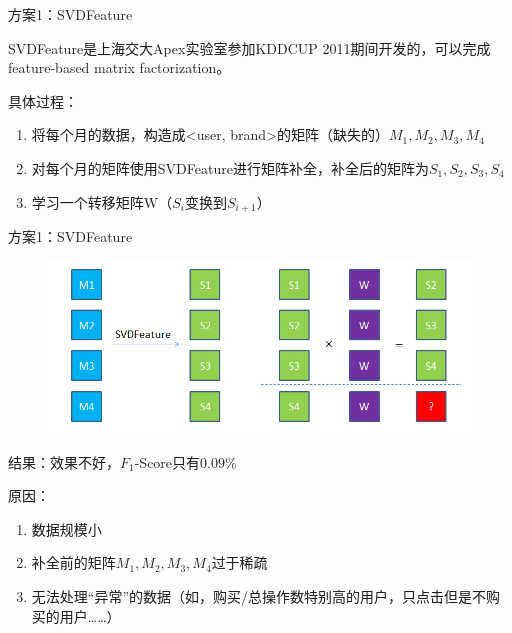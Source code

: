 \documentclass{beamer}
\begin{document}
\begin{frame}{方案1：SVDFeature}

SVDFeature是上海交大Apex实验室参加KDDCUP 2011期间开发的，可以完成feature-based matrix factorization。

\vspace{1em}

具体过程：
\begin{enumerate}
\item 将每个月的数据，构造成<user, brand>的矩阵（缺失的）$M_1, M_2, M_3, M_4$
\item 对每个月的矩阵使用SVDFeature进行矩阵补全，补全后的矩阵为$S_1, S_2, S_3, S_4$
\item 学习一个转移矩阵W（$S_i$变换到$S_{i + 1}$）
\end{enumerate}

\end{frame}

\begin{frame}{方案1：SVDFeature}

\begin{figure}
\includegraphics[width=0.8\linewidth]{./process}
\end{figure}

\vspace{-1em}

结果：效果不好，$F_1$-Score只有$0.09\%$

原因：
\begin{enumerate}
\item 数据规模小
\item 补全前的矩阵$M_1, M_2, M_3, M_4$过于稀疏
\item 无法处理“异常”的数据（如，购买/总操作数特别高的用户，只点击但是不购买的用户……）
\end{enumerate}

\end{frame}
\end{document}
